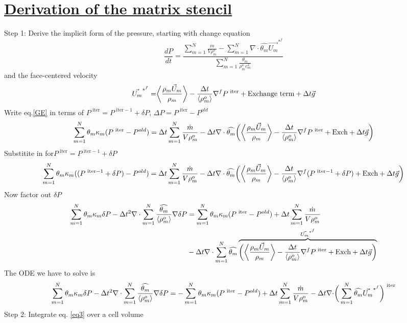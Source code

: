 \documentclass[fleqn]{article}
\newcommand{\SUM}[1]    {\ensuremath{\sum \limits_{{#1}=1}^N }}
\newcommand{\B}[1]      {\biggr{#1}}
\newcommand{\U}         {{\vec{U}}}
\newcommand{\rhoM}      {\ensuremath{\rho^{o}_m}}
\newcommand{\rhoMFC}    {\ensuremath{\langle \rhoM \rangle}}
\newcommand{\delt}      {\ensuremath{\Delta{t}} }
\newcommand{\velFC}     {\ensuremath{\vec{U_m}^{*^{f}} } }
\newcommand{\thetaUW}   {\ensuremath{\widehat{\theta_m}} }
\newcommand{\iter}      {\ensuremath{\text{ iter}}}
\newcommand{\massSrc}   {\ensuremath{ \SUM{m}  \frac{\dot{m}} {V \rhoM} } }
\newcommand{\termA}     {\ensuremath { \B{\langle} \frac{ \rho_m \U_m }{\rho_m} \B{\rangle} } }
\newcommand{\termB}     {\ensuremath{ \frac{ \delt }{\rhoMFC} \nabla^{f} } }
\begin{document}
\section{\underline{Derivation of the matrix stencil \hspace{3in}}}  
Step 1: \hspace{0.25in} Derive the implicit form of the pressure, starting with
change equation
\begin{equation}
     \label{GE}\frac{dP}{dt} = 
     \frac{\massSrc -  \SUM{m} \nabla \cdot \thetaUW \velFC}
                      {\SUM{m} \frac{\theta_m}{\rhoM c_m^2} }
\end{equation}
%
and the face-centered velocity
\[
    \vec{U_m}^{*^{f}} 
    = \termA - \termB{P^{\iter}} + \text{Exchange term}   + \delt\vec{g}
\]
%
Write eq.{\ref{GE}} in terms of $P^{\iter} = P^{\iter -1 } + \delta{P}$, $\Delta{P} = P^{\iter} - P^{old}$ 
\begin{equation}
\label{eq2}
\SUM{m} \theta_m \kappa_m (P^{\iter} -P^{old}) =
     \delt \massSrc 
  -  \delt \nabla \cdot \thetaUW \B{(} \termA -\termB{P^{\iter}} +\text{Exch} + \delt\vec{g} \B{)}
\end{equation}
Substitite in for$P^{\iter} = P^{\iter -1 } + \delta{P}$
\[
  \SUM{m} \theta_m \kappa_m ((P^{\iter -1 } + \delta{P}) -P^{old}) =
    \delt \massSrc 
  - \delt \nabla \cdot \thetaUW \B{(} \termA -\termB{(P^{\iter -1 } + \delta{P})} 
  +\text{Exch} + \delt\vec{g} \B{)}
\]
Now factor out $\delta{P}$
\begin{align}
  \SUM{m} \theta_m \kappa_m \delta{P} - 
  \delt^2 \nabla \cdot \SUM{m} \frac{\thetaUW}{\rhoMFC} \nabla \delta{P} \notag
  & = 
     \SUM{m} \theta_m \kappa_m(P^{\iter} - P^{old} ) + \delt \massSrc \notag \\
  &- \delt \nabla \cdot \SUM{m} \thetaUW  \notag
  \overbrace {\B{(} \termA -\termB{P^{\iter}} +\text{Exch} + \delt\vec{g} \B{)} }^{\velFC} \notag
\end{align}
%
%
The ODE we have to solve is
\begin{equation}
\label{eq3}
  \SUM{m} \theta_m \kappa_m \delta{P} - 
  \delt^2 \nabla \cdot \SUM{m} \frac{\thetaUW}{\rhoMFC} \nabla \delta{P}
  =
  -\SUM{m} \theta_m \kappa_m(P^{\iter} - P^{old} )
  + \delt \massSrc
  -  \delt \nabla \cdot \B{(} \SUM{m} \thetaUW \velFC \B{)} ^{\iter}
\end{equation}
%
\newpage
Step 2: \hspace{0.25in} Integrate eq. {\ref{eq3}} over a cell volume
\end{document}
